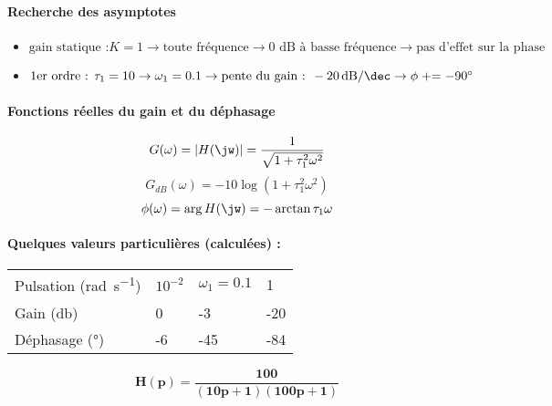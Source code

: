 \paragraph{Recherche des asymptotes}
\begin{itemize}
    \item $\textrm{gain statique :} K=1      \rightarrow 
           \textrm{toute fréquence}             \rightarrow 
           \textrm{0 dB à basse fréquence}      \rightarrow 
           \textrm{pas d'effet sur la phase}$
    \item $\textrm{1er ordre : }\tau_1=10        \rightarrow 
           \omega_1=0.1                         \rightarrow 
           \textrm{pente du gain : }
           \SI[per-mode=symbol]{-20}{\dB\per\dec} \rightarrow 
        \phi\mathrel{+}=-90\si{\degree}$ 
\end{itemize}

\begin{center}
    

    
\end{center}

\paragraph{Fonctions réelles du gain et du déphasage}
\[
G(\omega)=|H(\jw)|=\dfrac{1}{\sqrt{1+\tau_1^2\omega^2}}
\]
\[
G_{dB}(\omega)=-10\log{(1+\tau_1^2\omega^2)}
\]
\[
\phi(\omega)=\arg{H(\jw)}=-\arctan{\tau_1\omega}
\]

\paragraph{Quelques valeurs particulières (calculées) :}
\begin{center}
\begin{tabular}{P{3.5cm}P{2cm}P{2cm}P{2cm}}
\hline
\hline
Pulsation (\si{\radian\per\second}) & $10^{-2}$ & $\omega_1=0.1$ & 1 \\[1em]
Gain (\si{\decibel})                &     0     &     -3     &   -20 \\[1em]
Déphasage (\si{\degree})            &    -6     &     -45    &   -84 \\[1em]
\hline
\hline
\end{tabular}
\end{center}
\newpage
\question{}
\[
\boldsymbol{H(p) = \dfrac{100}{(10p+1)(100p+1)}}
\]
